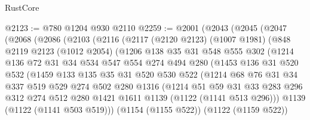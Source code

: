 \begin{lexlean}{RustCore}
\begin{coremodule}
@2123 := @780 @1204 @930 @2110
@2259 := @2001
    (@2043
      (@2045
        (@2047
          (@2068
            (@2086
              (@2103
                (@2116
                  (@2117
                    (@2120 @2123)
                    (@1007 @1981)
                    (@848
                      @2119
                      @2123
                      (@1012 @2054)
                      (@1206
                        @138
                        @35
                        @31
                        @548
                        @555
                        @302
                        (@1214
                          @136
                          @72
                          @31
                          @34
                          @534
                          @547
                          @554
                          @274
                          @494
                          @280
                          (@1453
                            @136
                            @31
                            @520
                            @532
                            (@1459
                              @133
                              @135
                              @35
                              @31
                              @520
                              @530
                              @522
                              (@1214
                                @68
                                @76
                                @31
                                @34
                                @337
                                @519
                                @529
                                @274
                                @502
                                @280
                                @1316
                                (@1214
                                  @51
                                  @59
                                  @31
                                  @33
                                  @283
                                  @296
                                  @312
                                  @274
                                  @512
                                  @280
                                  @1421
                                  @1611
                                  @1139
                                  (@1122 (@1141 @513 @296)))
                                @1139
                                (@1122 (@1141 @503 @519)))
                              (@1154 (@1155 @522))
                              (@1122 (@1159 @522))

\end{coremodule}
\end{lexlean}
